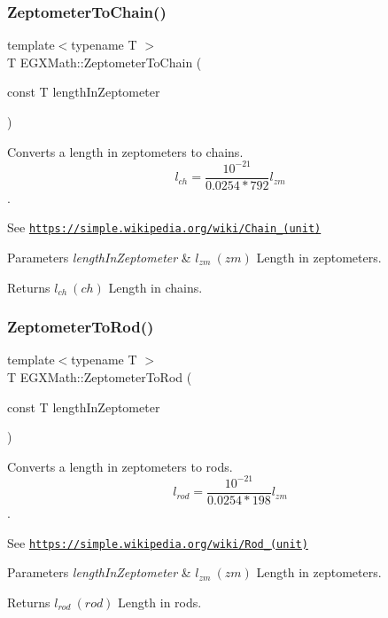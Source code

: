 \subsubsection{\texorpdfstring{Zeptometer\+To\+Chain()}{ZeptometerToChain()}}
{\footnotesize\ttfamily template$<$typename T $>$ \\
T E\+G\+X\+Math\+::\+Zeptometer\+To\+Chain (\begin{DoxyParamCaption}\item[{const T}]{length\+In\+Zeptometer }\end{DoxyParamCaption})}



Converts a length in zeptometers to chains. \[ l_{ch}= \frac{10^{-21}}{0.0254 * 792} l_{zm} \]. 

See \href{https://simple.wikipedia.org/wiki/Chain_(unit)}{\tt https\+://simple.\+wikipedia.\+org/wiki/\+Chain\+\_\+(unit)} 
\begin{DoxyParams}{Parameters}
{\em length\+In\+Zeptometer} & $ l_{zm}\ (zm)$ Length in zeptometers. \\
\hline
\end{DoxyParams}
\begin{DoxyReturn}{Returns}
$ l_{ch}\ (ch)$ Length in chains. 
\end{DoxyReturn}
\mbox{\label{group___e_g_x_math-_conversions-_length_conversions-_zeptometer-_surveyors_gac0c6193e55739ec7f4c3769ebddb65e2}} 
\subsubsection{\texorpdfstring{Zeptometer\+To\+Rod()}{ZeptometerToRod()}}
{\footnotesize\ttfamily template$<$typename T $>$ \\
T E\+G\+X\+Math\+::\+Zeptometer\+To\+Rod (\begin{DoxyParamCaption}\item[{const T}]{length\+In\+Zeptometer }\end{DoxyParamCaption})}



Converts a length in zeptometers to rods. \[ l_{rod}= \frac{10^{-21}}{0.0254 * 198} l_{zm} \]. 

See \href{https://simple.wikipedia.org/wiki/Rod_(unit)}{\tt https\+://simple.\+wikipedia.\+org/wiki/\+Rod\+\_\+(unit)} 
\begin{DoxyParams}{Parameters}
{\em length\+In\+Zeptometer} & $ l_{zm}\ (zm)$ Length in zeptometers. \\
\hline
\end{DoxyParams}
\begin{DoxyReturn}{Returns}
$ l_{rod}\ (rod)$ Length in rods. 
\end{DoxyReturn}
